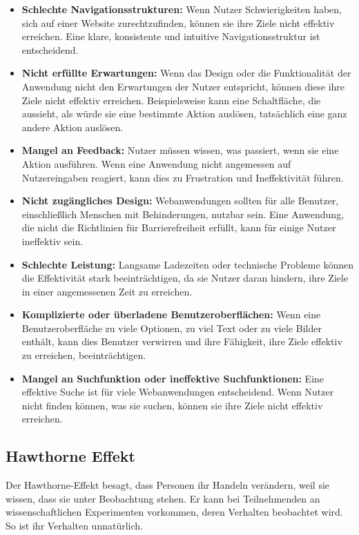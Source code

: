 \begin{itemize}
    \item \textbf{Schlechte Navigationsstrukturen:} Wenn Nutzer Schwierigkeiten haben, sich auf einer Website zurechtzufinden, können sie ihre Ziele nicht effektiv erreichen. Eine klare, konsistente und intuitive Navigationsstruktur ist entscheidend.
    \item \textbf{Nicht erfüllte Erwartungen:} Wenn das Design oder die Funktionalität der Anwendung nicht den Erwartungen der Nutzer entspricht, können diese ihre Ziele nicht effektiv erreichen. Beispielsweise kann eine Schaltfläche, die aussieht, als würde sie eine bestimmte Aktion auslösen, tatsächlich eine ganz andere Aktion auslösen.
    \item \textbf{Mangel an Feedback:} Nutzer müssen wissen, was passiert, wenn sie eine Aktion ausführen. Wenn eine Anwendung nicht angemessen auf Nutzereingaben reagiert, kann dies zu Frustration und Ineffektivität führen.
    \item \textbf{Nicht zugängliches Design:} Webanwendungen sollten für alle Benutzer, einschließlich Menschen mit Behinderungen, nutzbar sein. Eine Anwendung, die nicht die Richtlinien für Barrierefreiheit erfüllt, kann für einige Nutzer ineffektiv sein.
    \item \textbf{Schlechte Leistung:} Langsame Ladezeiten oder technische Probleme können die Effektivität stark beeinträchtigen, da sie Nutzer daran hindern, ihre Ziele in einer angemessenen Zeit zu erreichen.
    \item \textbf{Komplizierte oder überladene Benutzeroberflächen:} Wenn eine Benutzeroberfläche zu viele Optionen, zu viel Text oder zu viele Bilder enthält, kann dies Benutzer verwirren und ihre Fähigkeit, ihre Ziele effektiv zu erreichen, beeinträchtigen.
    \item \textbf{Mangel an Suchfunktion oder ineffektive Suchfunktionen:} Eine effektive Suche ist für viele Webanwendungen entscheidend. Wenn Nutzer nicht finden können, was sie suchen, können sie ihre Ziele nicht effektiv erreichen.
\end{itemize}

\subsection{Hawthorne Effekt}
Der Hawthorne-Effekt besagt, dass Personen ihr Handeln verändern, weil sie wissen, dass sie unter Beobachtung stehen. Er kann bei Teilnehmenden an wissenschaftlichen Experimenten vorkommen, deren Verhalten beobachtet wird. So ist ihr Verhalten unnatürlich.

